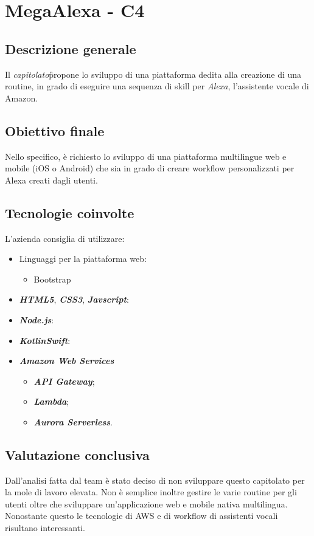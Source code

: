 \section{MegaAlexa - C4} \label{c4}
    \subsection{Descrizione generale}
    Il \textit{capitolato}\G propone lo sviluppo di una piattaforma
    dedita alla creazione di una routine, in grado di eseguire una sequenza
    di skill per \textit{Alexa}\GAlt, l'assistente vocale di Amazon.

    \subsection{Obiettivo finale}
    Nello specifico, \`e richiesto lo sviluppo di una piattaforma multilingue web e
    mobile (iOS o Android) che sia in grado di 
    creare workflow personalizzati per Alexa creati dagli utenti.

    \subsection{Tecnologie coinvolte}
    L'azienda consiglia di utilizzare:
    \begin{itemize}
    	\item Linguaggi per la piattaforma web:
    	\begin{itemize}
    		\item Bootstrap
    	\end{itemize}
        \item \textit{\textbf{HTML5}}\GAlt, \textit{\textbf{CSS3}}\GAlt, \textit{\textbf{Javscript}}\GAlt:
        \item \textit{\textbf{Node.js}}\GAlt:
        \item \textit{\textbf{Kotlin}}\GAlt \textit{\textbf{Swift}}\GAlt:
        \item \textit{\textbf{Amazon Web Services}}\GAlt
            \begin{itemize}
                \item \textit{\textbf{API Gateway}}\GAlt;
                \item \textit{\textbf{Lambda}}\GAlt;
                \item \textit{\textbf{Aurora Serverless}}\GAlt.
            \end{itemize}
    \end{itemize}

    \subsection{Valutazione conclusiva}
    Dall'analisi fatta dal team è stato deciso di non sviluppare questo capitolato per la mole di lavoro elevata.
    Non è semplice inoltre gestire le varie routine per gli utenti oltre che sviluppare un'applicazione web e mobile nativa multilingua.
    Nonostante questo le tecnologie di AWS e di workflow di assistenti vocali risultano interessanti.

